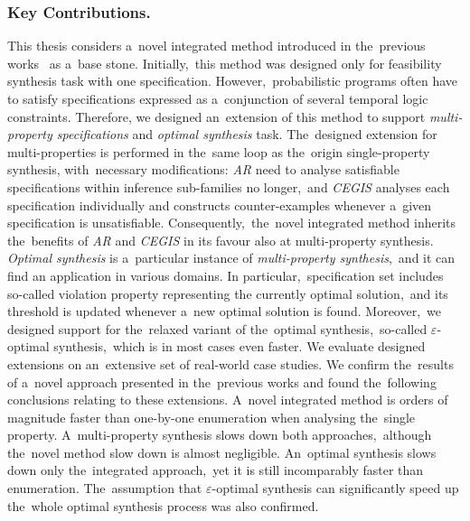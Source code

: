 \subsubsection*{Key Contributions.}
This thesis considers a~novel integrated method introduced in the~previous works~\cite{roman-DP,tacas21} as a~base stone.
Initially,~this method was designed only for feasibility synthesis task with one specification.
However,~probabilistic programs often have to satisfy specifications expressed as a~conjunction of several temporal logic constraints.
Therefore, we designed an~extension of this method to support \textit{multi-property specifications} and \textit{optimal synthesis} task.
The~designed extension for multi-properties is performed in the~same loop as the~origin single-property synthesis, with~necessary modifications: \textit{AR} need to analyse satisfiable specifications within inference sub-families no longer,~and \textit{CEGIS} analyses each specification individually and constructs counter-examples whenever a~given specification is unsatisfiable.
Consequently,~the~novel integrated method inherits the~benefits of \textit{AR} and \textit{CEGIS} in its favour also at multi-property synthesis.
\textit{Optimal synthesis} is a~particular instance of \textit{multi-property synthesis},~and it can find an application in various domains.
In particular,~specification set includes so-called violation property representing the currently optimal solution,~and its threshold is updated whenever a~new optimal solution is found.
Moreover,~we designed support for the~relaxed variant of the~optimal synthesis,~so-called $\varepsilon$-optimal synthesis,~which is in most cases even faster.
We evaluate designed extensions on an~extensive set of real-world case studies. 
We confirm the~results of a~novel approach presented in the~previous works and found the~following conclusions relating to these extensions.
A~novel integrated method is orders of magnitude faster than one-by-one enumeration when analysing the~single property.
A~multi-property synthesis slows down both approaches,~although the~novel method slow down is almost negligible.
An~optimal synthesis slows down only the~integrated approach,~yet it is still incomparably faster than enumeration.
The~assumption that $\varepsilon$-optimal synthesis can significantly speed up the~whole optimal synthesis process was also confirmed.




